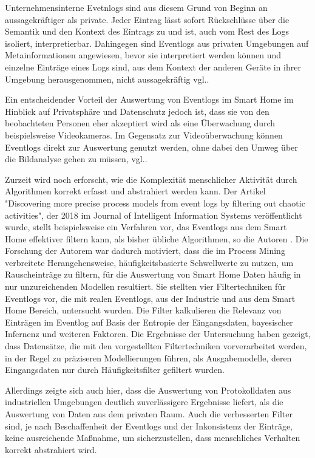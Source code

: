Unternehmensinterne Evetnlogs sind aus diesem Grund von Beginn an aussagekräftiger als private. Jeder Eintrag lässt sofort Rückschlüsse über die Semantik und den Kontext des Eintrags zu und ist, auch vom Rest des Logs isoliert, interpretierbar. Dahingegen sind Eventlogs aus privaten Umgebungen auf Metainformationen angewiesen, bevor sie interpretiert werden können und einzelne Einträge eines Logs sind, aus dem Kontext der anderen Geräte in ihrer Umgebung herausgenommen, nicht aussagekräftig vgl.\cite{Jaroucheh2011}.

Ein entscheidender Vorteil der Auswertung von Eventlogs im Smart Home im Hinblick auf Privatsphäre und Datenschutz jedoch ist, dass sie von den beobachteten Personen eher akzeptiert wird als eine Überwachung durch beispielsweise Videokameras. Im Gegensatz zur Videoüberwachung können Eventlogs direkt zur Auswertung genutzt werden, ohne dabei den Umweg über die Bildanalyse gehen zu müssen, vgl.\cite{TaxSidorova}.

Zurzeit wird noch erforscht, wie die Komplexität menschlicher Aktivität durch Algorithmen korrekt erfasst und abstrahiert werden kann. Der Artikel "Discovering more precise process models from event logs by filtering out chaotic activities", der 2018 im Journal of Intelligent Information Systems veröffentlicht wurde, stellt beispielsweise ein Verfahren vor, das Eventlogs aus dem Smart Home effektiver filtern kann, als bisher übliche Algorithmen, so die Autoren \cite{Tax2019}. Die Forschung der Autorem war dadurch motiviert, dass die im Process Mining verbreitete Herangehensweise, häufigkeitsbasierte Schwellwerte zu nutzen, um Rauscheinträge zu filtern, für die Auswertung von Smart Home Daten häufig in nur unzureichenden Modellen resultiert. 
Sie stellten vier Filtertechniken für Eventlogs vor, die mit realen Eventlogs, aus der Industrie und aus dem Smart Home Bereich, untersucht wurden. Die Filter kalkulieren die Relevanz von Einträgen im Eventlog auf Basis der Entropie der Eingangsdaten, bayesischer Infernenz und weiteren Faktoren. Die Ergebnisse der Untersuchung haben gezeigt, dass Datensätze, die mit den vorgestellten Filtertechniken vorverarbeitet werden, in der Regel zu präziseren Modellierungen führen, als Ausgabemodelle, deren Eingangsdaten nur durch Häufigkeitsfilter gefiltert wurden. 

Allerdings zeigte sich auch hier, dass die Auswertung von Protokolldaten aus industriellen Umgebungen deutlich zuverlässigere Ergebnisse liefert, als die Auswertung von Daten aus dem privaten Raum. Auch die verbesserten Filter sind, je nach Beschaffenheit der Eventlogs und der Inkonsistenz der Einträge, keine ausreichende Maßnahme, um sicherzustellen, dass menschliches Verhalten korrekt abstrahiert wird.

